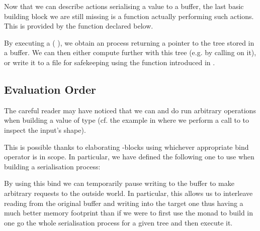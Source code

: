 Now that we can describe actions serialising a value to a buffer,
the last basic building block we are still missing is a function actually
performing such actions.
%
This is provided by the  function
declared below.


By executing a (  ), we
obtain an  process returning a pointer to the tree 
stored in a buffer.
%
We can then either compute further with this tree (e.g. by calling
 on it), or write it to a file for safekeeping
using the function 
introduced in .

\subsection{Evaluation Order}

The careful reader may have noticed that we can and do run arbitrary 
operations when building a value of type 
(cf. the  example in  where we perform
a call to  to inspect the input's shape).

This is possible thanks to \idris{} elaborating -blocks using
whichever appropriate bind operator is in scope. In particular, we have defined
the following one to use when building a serialisation process:


By using this bind we can temporarily pause writing to the buffer to make
arbitrary  requests to the outside world.
%
In particular, this allows us to interleave reading from the original buffer
and writing into the target one thus having a much better memory footprint than
if we were to first use the  monad to build in one go the whole
serialisation process for a given tree and then execute it.
